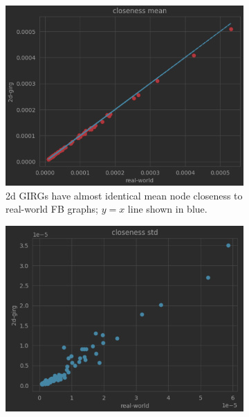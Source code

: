





\begin{figure}
    \centering
    \begin{subfigure}{0.49\textwidth}
    \includegraphics[width=\linewidth]{./figures/real_2d_closeness_mean_scatter.png}
    \caption{2d GIRGs have almost identical mean node closeness to real-world FB graphs; $y=x$ line shown in blue.}
    \label{fig:real_2d_closeness_mean_scatter}
    \end{subfigure}
    \begin{subfigure}{0.49\textwidth}
    \includegraphics[width= \linewidth]{./figures/real_2d_closeness_std_scatter.png}

\end{subfigure}
\end{figure}
